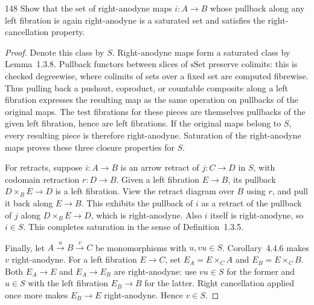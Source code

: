 \begin{exercise}{148}
Show that the set of right-anodyne maps $i\colon A\to B$ whose pullback along
any left fibration is again right-anodyne is a saturated set and satisfies the right-cancellation
property.

\begin{proof}
Denote this class by $S$. Right-anodyne maps form a saturated class
by Lemma~1.3.8.
Pullback functors between slices of $\mathrm{sSet}$ preserve colimits:
this is checked degreewise, where colimits of sets over a fixed set
are computed fibrewise.
Thus pulling back a pushout, coproduct, or countable composite along
a left fibration expresses the resulting map as the same operation
on pullbacks of the original maps.
The test fibrations for these pieces are themselves pullbacks of the
given left fibration, hence are left fibrations.
If the original maps belong to $S$, every resulting piece is therefore
right-anodyne. Saturation of the right-anodyne maps proves these
three closure properties for $S$.

For retracts, suppose $i\colon A\to B$ is an arrow retract of
$j\colon C\to D$ in $S$, with codomain retraction $r\colon D\to B$.
Given a left fibration $E\to B$, its pullback $D\times_B E\to D$
is a left fibration. View the retract diagram over $B$ using $r$,
and pull it back along $E\to B$.
This exhibits the pullback of $i$ as a retract of the pullback of $j$
along $D\times_B E\to D$, which is right-anodyne.
Also $i$ itself is right-anodyne, so $i\in S$.
This completes saturation in the sense of Definition~1.3.5.

Finally, let $A\xrightarrow{u}B\xrightarrow{v}C$ be monomorphisms
with $u,vu\in S$. Corollary~4.4.6 makes $v$ right-anodyne.
For a left fibration $E\to C$, set
$E_A=E\times_C A$ and $E_B=E\times_C B$.
Both $E_A\to E$ and $E_A\to E_B$ are right-anodyne:
use $vu\in S$ for the former and $u\in S$ with the left fibration
$E_B\to B$ for the latter.
Right cancellation applied once more makes $E_B\to E$
right-anodyne. Hence $v\in S$.
\end{proof}
\end{exercise}
